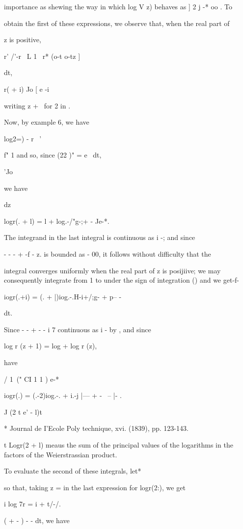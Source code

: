 importance as shewing the way in which log V z) behaves as ] 2 j -* oo
. To

obtain the first of these expressions, we observe that, when the real
part of

z is positive,

r' /'-r \ L 1 \ r* (o-t o-tz ]

dt,

r( + i) Jo [ e -i

writing z + \ for 2 in .

Now, by  example 6, we have

log2=) - r~ '

f" 1 and so, since (22 )" = e~ dt,

'Jo

we have

dz

logr(. + l) = l + log.-/"g-;+ - Je-*.

The integrand in the last integral is continuous as i -; and since

- - - + -f - z. is bounded as - 00, it follows without difficulty
that the

integral converges uniformly when the real part of z is posijiive; we
may consequently integrate from 1 to under the sign of integration
() and we get-f-

iogr(.+i) = (. + |)iog.-.H-i+/;g- + p-- -

dt.

Since - - + - - i 7 continuous as i - by , and since

log r (z + 1) = log + log r (z),

have

/ 1\ (" CI 1 1 ) e-*

iogr(.) = (.-2)iog.-. + i.-j |--- + - \ -- |- .

J (2 t e' - l)t

* Journal de I'Ecole Poly technique, xvi. (1839), pp. 123-143.

t Logr(2 + l) meaus the sum of the principal values of the logarithms
in the factors of the Weierstrassian product.

%
%

To evaluate the second of these integrals, let*

so that, taking z = in the last expression for logr(2:), we get

i log 7r = i + t/-/.

( + - ) - - dt, we have

